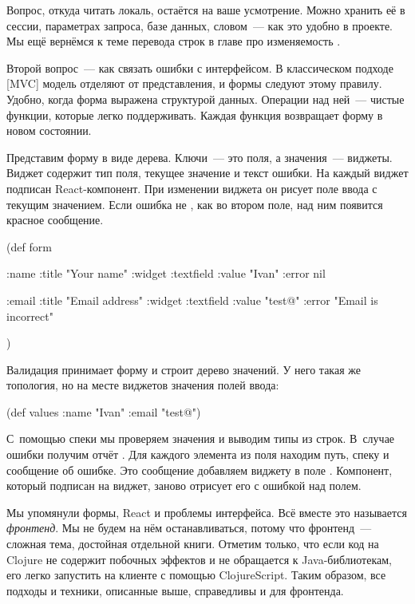 Вопрос, откуда читать локаль, остаётся на ваше усмотрение. Можно хранить её в
сессии, параметрах запроса, базе данных, словом~--- как это удобно в проекте. Мы
ещё вернёмся к теме перевода строк в главе про изменяемость .

Второй вопрос~--- как связать ошибки с интерфейсом. В классическом подходе
[MVC]
модель отделяют от представления, и формы следуют этому правилу. Удобно, когда
форма выражена структурой данных. Операции над ней~--- чистые функции,
которые легко поддерживать. Каждая функция возвращает форму в новом состоянии.

Представим форму в виде дерева. Ключи~--- это поля, а значения~---
виджеты. Виджет содержит тип поля, текущее значение и текст ошибки. На каждый
виджет подписан React-компонент. При изменении виджета он рисует поле ввода с
текущим значением. Если ошибка не , как во втором поле, над ним
появится красное сообщение.


\begin{clojure}
(def form
  {:name {:title "Your name"
          :widget :textfield
          :value "Ivan"
          :error nil}

   :email {:title "Email address"
           :widget :textfield
           :value "test@"
           :error "Email is incorrect"}})
\end{clojure}


Валидация принимает форму и строит дерево значений. У него такая же топология, но
на месте виджетов значения полей ввода:


\begin{clojure}
(def values
  {:name "Ivan"
   :email "test@"})
\end{clojure}


С~помощью спеки мы проверяем значения и выводим типы из строк. В~случае ошибки
получим отчёт . Для каждого элемента из поля 
находим путь, спеку и сообщение об ошибке. Это сообщение добавляем виджету в
поле . Компонент, который подписан на виджет, заново отрисует его с
ошибкой над полем.


Мы упомянули формы, React и проблемы интерфейса. Всё вместе это называется
\emph{фронтенд}. Мы не будем на нём останавливаться, потому что фронтенд~---
сложная тема, достойная отдельной книги. Отметим только, что если код на Clojure
не содержит побочных эффектов и не обращается к Java-библиотекам, его легко
запустить на клиенте с помощью ClojureScript. Таким образом, все подходы и
техники, описанные выше, справедливы и для фронтенда.

